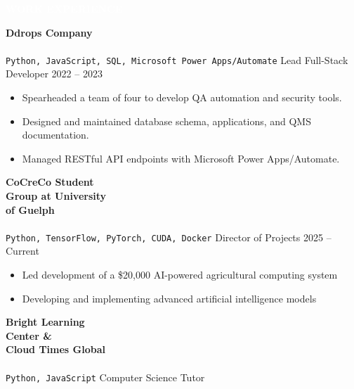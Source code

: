 \documentclass[9pt]{src/developercv} %
\begin{document}

	\vspace{\baselineskip} %
	\colorbox{sky900}{\textcolor{white}{\LARGE\MakeUppercase{\textbf{Work Experience}}}}
	\vspace{1.0\baselineskip}%

	\begin{entrylist}
		\entry
			{\textbf{Ddrops Company}\\\\\small{\texttt{Python, JavaScript, SQL, Microsoft Power Apps/Automate}}}
			{Lead Full-Stack Developer}
			{2022 -- 2023}
			{
				\vspace{-1.0\baselineskip}%
				\begin{itemize}
					\item Spearheaded a team of four to develop QA automation and security tools.
					\item Designed and maintained database schema, applications, and QMS documentation.
					\item Managed RESTful API endpoints with Microsoft Power Apps/Automate.
				\end{itemize}
			}
		\entry
			{\textbf{CoCreCo Student\\Group at University\\of Guelph}\\\\\small{\texttt{Python, TensorFlow, PyTorch, CUDA, Docker}}}
			{Director of Projects}
			{2025 -- Current}
			{
				\vspace{-1.0\baselineskip}%
				\begin{itemize}
					\item Led development of a \$20,000 AI-powered agricultural computing system
					\item Developing and implementing advanced artificial intelligence models
				\end{itemize}
			}
		\entry
			{\textbf{Bright Learning\\Center \&\\Cloud Times Global}\\\\\small{\texttt{Python, JavaScript}}}
			{Computer Science Tutor}

\end{entrylist}
\end{document}
